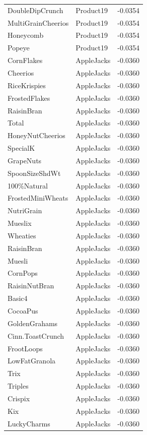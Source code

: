 \begin{table}[!htbp]
\begin{tabular}{lll}
\\
DoubleDipCrunch & Product19 & -0.0354
\\
MultiGrainCheerios & Product19 & -0.0354
\\
Honeycomb & Product19 & -0.0354
\\
Popeye & Product19 & -0.0354
\\
CornFlakes & AppleJacks & -0.0360
\\
Cheerios & AppleJacks & -0.0360
\\
RiceKrispies & AppleJacks & -0.0360
\\
FrostedFlakes & AppleJacks & -0.0360
\\
RaisinBran & AppleJacks & -0.0360
\\
Total & AppleJacks & -0.0360
\\
HoneyNutCheerios & AppleJacks & -0.0360
\\
SpecialK & AppleJacks & -0.0360
\\
GrapeNuts & AppleJacks & -0.0360
\\
SpoonSizeShdWt & AppleJacks & -0.0360
\\
100\%Natural & AppleJacks & -0.0360
\\
FrostedMiniWheats & AppleJacks & -0.0360
\\
NutriGrain & AppleJacks & -0.0360
\\
Mueslix & AppleJacks & -0.0360
\\
Wheaties & AppleJacks & -0.0360
\\
RaisinBran & AppleJacks & -0.0360
\\
Muesli & AppleJacks & -0.0360
\\
CornPops & AppleJacks & -0.0360
\\
RaisinNutBran & AppleJacks & -0.0360
\\
Basic4 & AppleJacks & -0.0360
\\
CocoaPus & AppleJacks & -0.0360
\\
GoldenGrahams & AppleJacks & -0.0360
\\
Cinn.ToastCrunch & AppleJacks & -0.0360
\\
FrootLoops & AppleJacks & -0.0360
\\
LowFatGranola & AppleJacks & -0.0360
\\
Trix & AppleJacks & -0.0360
\\
Triples & AppleJacks & -0.0360
\\
Crispix & AppleJacks & -0.0360
\\
Kix & AppleJacks & -0.0360
\\
LuckyCharms & AppleJacks & -0.0360

\end{tabular}
\end{table}
